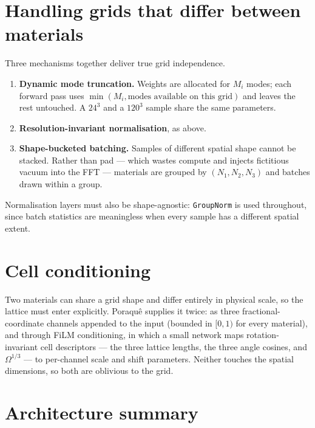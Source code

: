 \section{Handling grids that differ between materials}

Three mechanisms together deliver true grid independence.

\begin{enumerate}
  \item \textbf{Dynamic mode truncation.} Weights are allocated for $M_i$
    modes; each forward pass uses
    $\min(M_i, \text{modes available on this grid})$ and leaves the rest
    untouched. A $24^3$ and a $120^3$ sample share the same parameters.
  \item \textbf{Resolution-invariant normalisation}, as above.
  \item \textbf{Shape-bucketed batching.} Samples of different spatial shape
    cannot be stacked. Rather than pad --- which wastes compute and injects
    fictitious vacuum into the FFT --- materials are grouped by
    $(N_1,N_2,N_3)$ and batches drawn within a group.
\end{enumerate}

Normalisation layers must also be shape-agnostic: \texttt{GroupNorm} is used
throughout, since batch statistics are meaningless when every sample has a
different spatial extent.

\section{Cell conditioning}

Two materials can share a grid shape and differ entirely in physical scale, so
the lattice must enter explicitly. Poraqu\^e supplies it twice: as three
fractional-coordinate channels appended to the input (bounded in $[0,1)$ for
every material), and through FiLM conditioning, in which a small network maps
rotation-invariant cell descriptors --- the three lattice lengths, the three
angle cosines, and $\Omega^{1/3}$ --- to per-channel scale and shift
parameters. Neither touches the spatial dimensions, so both are oblivious to
the grid.

\section{Architecture summary}

